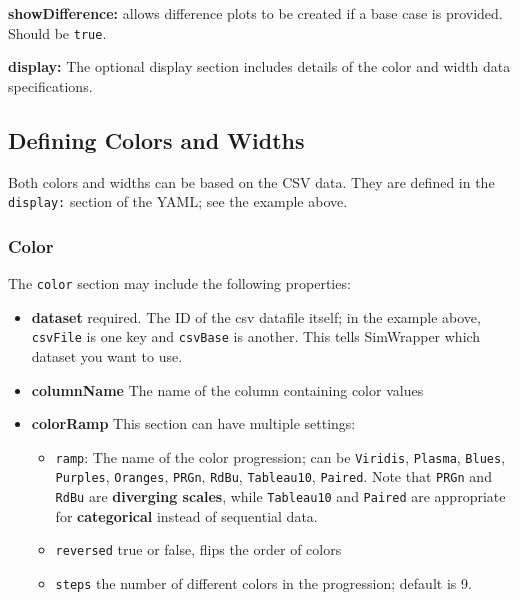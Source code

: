 \textbf{showDifference:} allows difference plots to be created if a base
case is provided. Should be \texttt{true}.

\textbf{display:} The optional display section includes details of the
color and width data specifications.

\hypertarget{defining-colors-and-widths}{%
\subsection{Defining Colors and
Widths}\label{defining-colors-and-widths}}

Both colors and widths can be based on the CSV data. They are defined in
the \texttt{display:} section of the YAML; see the example above.

\hypertarget{color}{%
\subsubsection{Color}\label{color}}

The \texttt{color} section may include the following properties:

\begin{itemize}
\tightlist
\item
  \textbf{dataset} required. The ID of the csv datafile itself; in the
  example above, \texttt{csvFile} is one key and \texttt{csvBase} is
  another. This tells SimWrapper which dataset you want to use.
\item
  \textbf{columnName} The name of the column containing color values
\item
  \textbf{colorRamp} This section can have multiple settings:

  \begin{itemize}
  \tightlist
  \item
    \texttt{ramp}: The name of the color progression; can be
    \texttt{Viridis}, \texttt{Plasma}, \texttt{Blues}, \texttt{Purples},
    \texttt{Oranges}, \texttt{PRGn}, \texttt{RdBu}, \texttt{Tableau10},
    \texttt{Paired}. Note that \texttt{PRGn} and \texttt{RdBu} are
    \textbf{diverging scales}, while \texttt{Tableau10} and
    \texttt{Paired} are appropriate for \textbf{categorical} instead of
    sequential data.
  \item
    \texttt{reversed} true or false, flips the order of colors
  \item
    \texttt{steps} the number of different colors in the progression;
    default is 9.
  \end{itemize}
\end{itemize}

